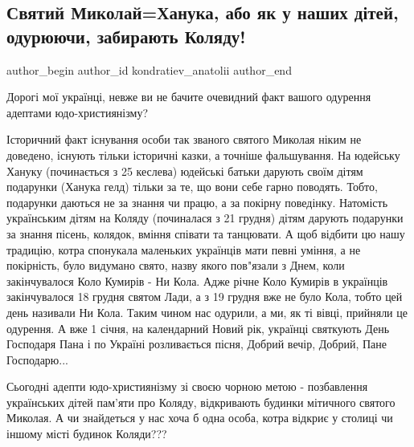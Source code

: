  
 
 
 
 

\subsection{Святий Миколай=Ханука, або як у наших дітей, одурюючи, забирають Коляду!}
\label{sec:04_12_2020.fb.kondratiev_anatolii.1.koljada_sv_nikolai}

\ifcmt
  author_begin
   author_id kondratiev_anatolii
  author_end
\fi


Дорогі мої українці, невже ви не бачите очевидний факт вашого одурення адептами
юдо-християнізму? 

Історичний факт існування особи так званого святого Миколая ніким не доведено,
існують тільки історичні казки, а точніше фальшування. На юдейську Хануку
(починається з 25 кеслева) юдейські батьки дарують своїм дітям подарунки
(Ханука гелд) тільки за те, що вони себе гарно поводять. Тобто, подарунки
даються не за знання чи працю, а за покірну поведінку. Натомість українським
дітям на Коляду (починалася з 21 грудня) дітям дарують подарунки за знання
пісень, колядок, вміння співати та танцювати. А щоб відбити цю нашу традицію,
котра спонукала маленьких українців мати певні уміння, а не покірність, було
видумано свято, назву якого пов"язали з Днем, коли закінчувалося Коло Кумирів -
Ни Кола. Адже річне Коло Кумирів в українців закінчувалося 18 грудня святом
Лади, а з 19 грудня вже не було Кола, тобто цей день називали Ни Кола. Таким
чином нас одурили, а ми, як ті вівці, прийняли це одурення. А вже 1 січня, на
календарний Новий рік, українці святкують День Господаря Пана і по Україні
розливається пісня, Добрий вечір, Добрий, Пане Господарю...

Сьогодні адепти юдо-християнізму зі своєю чорною метою - позбавлення українських
дітей пам'яти про Коляду, відкривають будинки мітичного святого Миколая. А чи
знайдеться у нас хоча б одна особа, котра відкриє у столиці чи іншому місті
будинок Коляди???
